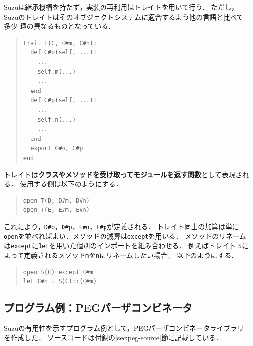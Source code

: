 \documentclass{ipsjprosym}
\begin{document}
Suzuは継承機構を持たず，実装の再利用はトレイト\cite{Scharli:2003}を用いて行う．
ただし，Suzuのトレイトはそのオブジェクトシステムに適合するよう他の言語と比べて多少
趣の異なるものとなっている．
\begin{quote}
\begin{verbatim}
trait T(C, C#m, C#n):
  def C#o(self, ...):
    ...
    self.m(...)
    ...
  end
  def C#p(self, ...):
    ...
    self.n(...)
    ...
  end
  export C#o, C#p
end
\end{verbatim}
\end{quote}
トレイトは\textbf{クラスやメソッドを受け取ってモジュールを返す関数}として表現される．
使用する側は以下のようにする．
\begin{quote}
\begin{verbatim}
open T(D, D#m, D#n)
open T(E, E#m, E#n)
\end{verbatim}
\end{quote}
これにより，\verb|D#o|，\verb|D#p|，\verb|E#o|，\verb|E#p|が定義される．
トレイト同士の加算は単に\verb|open|を並べればよい．メソッドの減算は\verb|except|を用いる．
メソッドのリネームは\verb|except|に\verb|let|を用いた個別のインポートを組み合わせる．
例えばトレイト \verb|S|によって定義されるメソッド\verb|m|を\verb|n|にリネームしたい場合，
以下のようにする．
\begin{quote}
\begin{verbatim}
open S(C) except C#m
let C#n = S(C)::(C#m)
\end{verbatim}
\end{quote}

\subsection{プログラム例：PEGパーザコンビネータ}

Suzuの有用性を示すプログラム例として，PEGパーザコンビネータライブラリを作成した．
ソースコードは付録の\ref{sec:peg-source}節に記載している．
\end{document}

